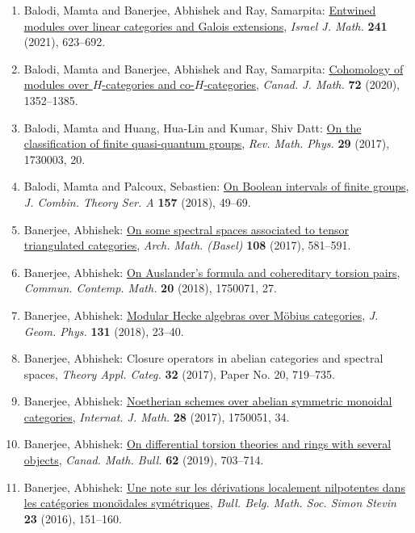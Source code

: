 \begin{enumerate}
\item Balodi, Mamta and Banerjee, Abhishek and Ray, Samarpita: \href{https://doi.org/10.1007/s11856-021-2108-2}{Entwined modules over linear categories and {G}alois
extensions}, \emph{Israel J. Math.} {\bf 241} (2021), 623--692.
\item Balodi, Mamta and Banerjee, Abhishek and Ray, Samarpita: \href{https://doi.org/10.4153/s0008414x19000403}{Cohomology of modules over {$H$}-categories and
co-{$H$}-categories}, \emph{Canad. J. Math.} {\bf 72} (2020), 1352--1385.
\item Balodi, Mamta and Huang, Hua-Lin and Kumar, Shiv Datt: \href{https://doi.org/10.1142/S0129055X17300035}{On the classification of finite quasi-quantum groups}, \emph{Rev. Math. Phys.} {\bf 29} (2017), 1730003, 20.
\item Balodi, Mamta and Palcoux, Sebastien: \href{https://doi.org/10.1016/j.jcta.2018.02.004}{On {B}oolean intervals of finite groups}, \emph{J. Combin. Theory Ser. A} {\bf 157} (2018), 49--69.
\item Banerjee, Abhishek: \href{https://doi.org/10.1007/s00013-017-1025-4}{On some spectral spaces associated to tensor triangulated
categories}, \emph{Arch. Math. (Basel)} {\bf 108} (2017), 581--591.
\item Banerjee, Abhishek: \href{https://doi.org/10.1142/S0219199717500717}{On {A}uslander's formula and cohereditary torsion pairs}, \emph{Commun. Contemp. Math.} {\bf 20} (2018), 1750071, 27.
\item Banerjee, Abhishek: \href{https://doi.org/10.1016/j.geomphys.2018.04.008}{Modular {H}ecke algebras over {M}\"{o}bius categories}, \emph{J. Geom. Phys.} {\bf 131} (2018), 23--40.
\item Banerjee, Abhishek: Closure operators in abelian categories and spectral spaces, \emph{Theory Appl. Categ.} {\bf 32} (2017), Paper No. 20, 719--735.
\item Banerjee, Abhishek: \href{https://doi.org/10.1142/S0129167X17500513}{Noetherian schemes over abelian symmetric monoidal categories}, \emph{Internat. J. Math.} {\bf 28} (2017), 1750051, 34.
\item Banerjee, Abhishek: \href{https://doi.org/10.4153/s0008439518000656}{On differential torsion theories and rings with several
objects}, \emph{Canad. Math. Bull.} {\bf 62} (2019), 703--714.
\item Banerjee, Abhishek: \href{http://projecteuclid.org/euclid.bbms/1457560860}{Une note sur les d\'erivations localement nilpotentes dans les
cat\'egories mono\"\i dales sym\'etriques}, \emph{Bull. Belg. Math. Soc. Simon Stevin} {\bf 23} (2016), 151--160.

\end{enumerate}
